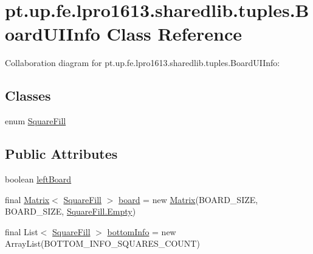 \hypertarget{classpt_1_1up_1_1fe_1_1lpro1613_1_1sharedlib_1_1tuples_1_1_board_u_i_info}{}\section{pt.\+up.\+fe.\+lpro1613.\+sharedlib.\+tuples.\+Board\+U\+I\+Info Class Reference}
\label{classpt_1_1up_1_1fe_1_1lpro1613_1_1sharedlib_1_1tuples_1_1_board_u_i_info}


Collaboration diagram for pt.\+up.\+fe.\+lpro1613.\+sharedlib.\+tuples.\+Board\+U\+I\+Info\+:
\subsection*{Classes}
\begin{DoxyCompactItemize}
\item 
enum \hyperlink{enumpt_1_1up_1_1fe_1_1lpro1613_1_1sharedlib_1_1tuples_1_1_board_u_i_info_1_1_square_fill}{Square\+Fill}
\end{DoxyCompactItemize}
\subsection*{Public Attributes}
\begin{DoxyCompactItemize}
\item 
boolean \hyperlink{classpt_1_1up_1_1fe_1_1lpro1613_1_1sharedlib_1_1tuples_1_1_board_u_i_info_a2433a0822ba65fcc939b72c4dee5b0a9}{left\+Board}
\item 
final \hyperlink{classpt_1_1up_1_1fe_1_1lpro1613_1_1sharedlib_1_1utils_1_1_matrix}{Matrix}$<$ \hyperlink{enumpt_1_1up_1_1fe_1_1lpro1613_1_1sharedlib_1_1tuples_1_1_board_u_i_info_1_1_square_fill}{Square\+Fill} $>$ \hyperlink{classpt_1_1up_1_1fe_1_1lpro1613_1_1sharedlib_1_1tuples_1_1_board_u_i_info_ae1dbe1c7d036dd75daa2a97113db5471}{board} = new \hyperlink{classpt_1_1up_1_1fe_1_1lpro1613_1_1sharedlib_1_1utils_1_1_matrix}{Matrix}(B\+O\+A\+R\+D\+\_\+\+S\+I\+ZE, B\+O\+A\+R\+D\+\_\+\+S\+I\+ZE, \hyperlink{enumpt_1_1up_1_1fe_1_1lpro1613_1_1sharedlib_1_1tuples_1_1_board_u_i_info_1_1_square_fill_af67b97ac891abc7f497730b69ed2225c}{Square\+Fill.\+Empty})
\item 
final List$<$ \hyperlink{enumpt_1_1up_1_1fe_1_1lpro1613_1_1sharedlib_1_1tuples_1_1_board_u_i_info_1_1_square_fill}{Square\+Fill} $>$ \hyperlink{classpt_1_1up_1_1fe_1_1lpro1613_1_1sharedlib_1_1tuples_1_1_board_u_i_info_a403e4e6523593c1b782df7cdccaa6779}{bottom\+Info} = new Array\+List(B\+O\+T\+T\+O\+M\+\_\+\+I\+N\+F\+O\+\_\+\+S\+Q\+U\+A\+R\+E\+S\+\_\+\+C\+O\+U\+NT)
\end{DoxyCompactItemize}


